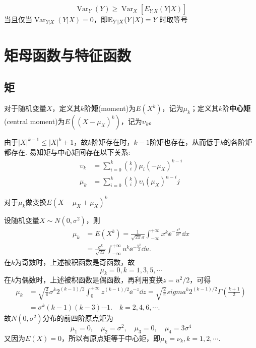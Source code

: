 \begin{corollary}
    \[ \operatorname{Var}_Y(Y) \ge \operatorname{Var}_X[E_{Y|X}(Y|X)] \]
    当且仅当$\operatorname{Var}_{Y|X}(Y|X)=0$，即$\mathbb{E}_{Y|X}(Y|X)=Y$时取等号
\end{corollary}

\section{矩母函数与特征函数}

\subsection{矩}

\begin{definition}
    对于随机变量$X$，定义其$k$阶\textbf{矩}(moment)为$E(X^k)$，记为$\mu_k$；定义其$k$阶\textbf{中心矩}(central moment)为$E((X-\mu_X)^k)$，记为$\upsilon_k$。
\end{definition}
由于$|X|^{k-1}\le |X|^k+1$，故$k$阶矩存在时，$k-1$阶矩也存在，从而低于$k$的各阶矩都存在.
易知矩与中心矩间存在以下关系:
\begin{align*}
    \upsilon_k & =\sum_{i=0}^k \binom{k}{i} \mu_i(-\mu_X)^{k-i}      \\
    \mu_k      & =\sum_{i=0}^k \binom{k}{i} \upsilon_i(\mu_X)^{n-i}j
\end{align*}
\begin{note}
    对于$\mu_k$做变换$E(X-\mu_X+\mu_X)^k$
\end{note}

\begin{example}
    设随机变量$X\sim N(0,\sigma^2)$，则
    \begin{align*}
        \mu_k & = E(X^k) = \frac1{\sqrt{2\pi}\sigma}\int_{-\infty}^{+\infty} x^k\ee^{-\frac{x^2}{2\sigma^2}} \dd x \\
              & = \frac{\sigma^k}{\sqrt{2\pi}} \int_{-\infty}^{+\infty}u^k\ee^{-\frac{u^2}2}\dd u.
    \end{align*}
    在$k$为奇数时，上述被积函数是奇函数，故
    \[ \mu_k = 0, k=1,3,5,\cdots \]
    在$k$为偶数时，上述被积函数是偶函数，再利用变换$z=u^2/2$，可得
    \begin{align*}
        \mu_k & = \sqrt{\frac2\pi}\sigma^k2^{(k-1)/2} \int_0^{+\infty}z^{(k-1)/2}\ee^{-z} \dd z = \sqrt{\frac2\pi}sigma^k2^{(k-1)/2} \Gamma\left( \frac{k+1}2 \right) \\
              & = \sigma^k(k-1)(k-3)\cdots1.\quad k=2,4,6,\cdots.
    \end{align*}
    故$N(0,\sigma^2)$分布的前四阶原点矩为
    \[ \mu_1 = 0,\quad \mu_2 = \sigma^2,\quad \mu_3 = 0,\quad \mu_4 = 3\sigma^4 \]
    又因为$E(X)=0$，所以有原点矩等于中心矩，即$\mu_k=\nu_k,k=1,2,\cdots$.
\end{example}

